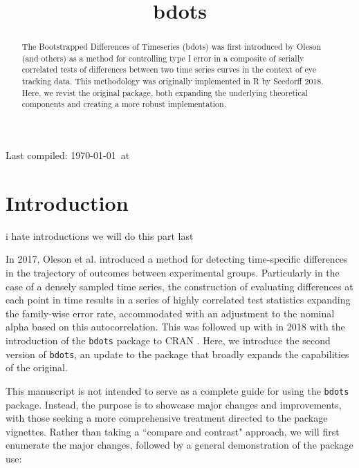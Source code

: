 \documentclass{article}
\title{bdots}
\date{}
\newcommand{\xt}{\texttt}%
\begin{document}

\maketitle

Last compiled: \today \  at \currenttime

%

\begin{abstract}
The Bootstrapped Differences of Timeseries (bdots) was first introduced by Oleson (and others) as a method for controlling type I error in a composite of serially correlated tests of differences between two time series curves in the context of eye tracking data.  This methodology was originally implemented in R by Seedorff 2018. Here, we revist the original package, both expanding the underlying theoretical components and creating a more robust implementation.
\end{abstract}


\section{Introduction}

i hate introductions we will do this part last

In 2017, Oleson et al. introduced a method for detecting time-specific differences in the trajectory of outcomes between experimental groups. Particularly in the case of a densely sampled time series, the construction of evaluating differences at each point in time results in a series of highly correlated test statistics expanding the family-wise error rate, accommodated with an adjustment to the nominal alpha based on this autocorrelation. This was followed up with in 2018 with the introduction of the \xt{bdots} package to CRAN \cite{seedorff2018bdots}. Here, we introduce the second version of \texttt{bdots}, an update to the package that broadly expands the capabilities of the original. 

This manuscript is not intended to serve as a complete guide for using the \xt{bdots} package. Instead, the purpose is to showcase major changes and improvements, with those seeking a more comprehensive treatment directed to the package vignettes. Rather than taking a ``compare and contrast" approach, we will first enumerate the major changes, followed by a general demonstration of the package use:
\end{document}
